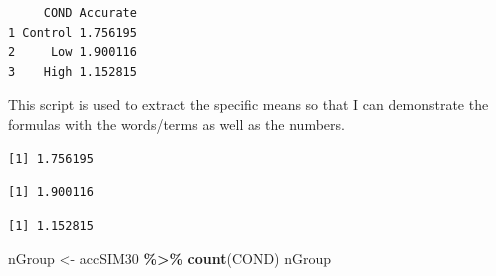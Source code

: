\documentclass[
  11pt,
]{book}
\newenvironment{Shaded}{\begin{snugshade}}{\end{snugshade}}
\newcommand{\DecValTok}[1]{\textcolor[rgb]{0.06,0.06,0.06}{#1}}
\newcommand{\FunctionTok}[1]{\textcolor[rgb]{0.27,0.27,0.27}{\textbf{#1}}}
\newcommand{\NormalTok}[1]{#1}
\newcommand{\OtherTok}[1]{\textcolor[rgb]{0.37,0.37,0.37}{#1}}
\newcommand{\SpecialCharTok}[1]{\textcolor[rgb]{0.43,0.43,0.43}{\textbf{#1}}}
\begin{document}
\begin{verbatim}
     COND Accurate
1 Control 1.756195
2     Low 1.900116
3    High 1.152815
\end{verbatim}

This script is used to extract the specific means so that I can demonstrate the formulas with the words/terms as well as the numbers.

\begin{Shaded}
\end{Shaded}

\begin{verbatim}
[1] 1.756195
\end{verbatim}

\begin{Shaded}
\end{Shaded}

\begin{verbatim}
[1] 1.900116
\end{verbatim}

\begin{Shaded}
\end{Shaded}

\begin{verbatim}
[1] 1.152815
\end{verbatim}

\begin{Shaded}
\begin{Highlighting}[]
\NormalTok{nGroup }\OtherTok{\textless{}{-}}\NormalTok{ accSIM30 }\SpecialCharTok{\%\textgreater{}\%}
    \FunctionTok{count}\NormalTok{(COND)}
\NormalTok{nGroup}
\end{Highlighting}
\end{Shaded}
\end{document}
